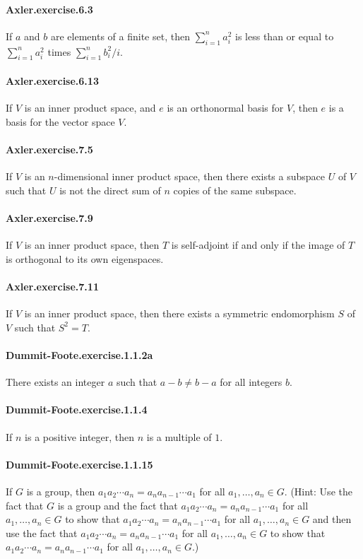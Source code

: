 \documentclass{article}
\begin{document}
\paragraph{Axler.exercise.6.3} If $a$ and $b$ are elements of a finite set, then $\sum_{i=1}^n a_i^2$ is less than or equal to $\sum_{i=1}^n a_i^2$ times $\sum_{i=1}^n b_i^2 / i$.

\paragraph{Axler.exercise.6.13} If $V$ is an inner product space, and $e$ is an orthonormal basis for $V$, then $e$ is a basis for the vector space $V$.

\paragraph{Axler.exercise.7.5} If $V$ is an $n$-dimensional inner product space, then there exists a subspace $U$ of $V$ such that $U$ is not the direct sum of $n$ copies of the same subspace.

\paragraph{Axler.exercise.7.9} If $V$ is an inner product space, then $T$ is self-adjoint if and only if the image of $T$ is orthogonal to its own eigenspaces.

\paragraph{Axler.exercise.7.11} If $V$ is an inner product space, then there exists a symmetric endomorphism $S$ of $V$ such that $S^2 = T$.

\paragraph{Dummit-Foote.exercise.1.1.2a} There exists an integer $a$ such that $a - b \neq b - a$ for all integers $b$.

\paragraph{Dummit-Foote.exercise.1.1.4} If $n$ is a positive integer, then $n$ is a multiple of $1$.

\paragraph{Dummit-Foote.exercise.1.1.15} If $G$ is a group, then $a_1a_2\cdots a_n = a_na_{n-1}\cdots a_1$ for all $a_1, \dots, a_n \in G$. (Hint: Use the fact that $G$ is a group and the fact that $a_1a_2\cdots a_n = a_na_{n-1}\cdots a_1$ for all $a_1, \dots, a_n \in G$ to show that $a_1a_2\cdots a_n = a_na_{n-1}\cdots a_1$ for all $a_1, \dots, a_n \in G$ and then use the fact that $a_1a_2\cdots a_n = a_na_{n-1}\cdots a_1$ for all $a_1, \dots, a_n \in G$ to show that $a_1a_2\cdots a_n = a_na_{n-1}\cdots a_1$ for all $a_1, \dots, a_n \in G$.)
\end{document}
